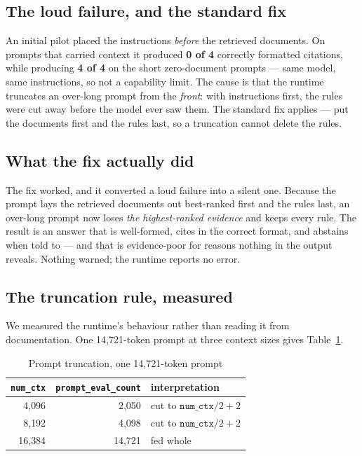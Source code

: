 \documentclass[conference]{IEEEtran}
\begin{document}
\subsection{The loud failure, and the standard fix}

An initial pilot placed the instructions \emph{before} the retrieved documents.
On prompts that carried context it produced \textbf{0 of 4} correctly formatted
citations, while producing \textbf{4 of 4} on the short zero-document prompts ---
same model, same instructions, so not a capability limit. The cause is that the
runtime truncates an over-long prompt from the \emph{front}: with instructions
first, the rules were cut away before the model ever saw them. The standard fix
applies --- put the documents first and the rules last, so a truncation cannot
delete the rules.

\subsection{What the fix actually did}

The fix worked, and it converted a loud failure into a silent one. Because the
prompt lays the retrieved documents out best-ranked first and the rules last, an
over-long prompt now loses \emph{the highest-ranked evidence} and keeps every
rule. The result is an answer that is well-formed, cites in the correct format,
and abstains when told to --- and that is evidence-poor for reasons nothing in the
output reveals. Nothing warned; the runtime reports no error.

\subsection{The truncation rule, measured}

We measured the runtime's behaviour rather than reading it from documentation.
One 14{,}721-token prompt at three context sizes gives Table~\ref{tab:trunc}.

\begin{table}[t]
\caption{Prompt truncation, one 14{,}721-token prompt}
\label{tab:trunc}
\centering
\begin{tabular}{rrl}
\toprule
\texttt{num\_ctx} & \texttt{prompt\_eval\_count} & interpretation \\
\midrule
4{,}096  & 2{,}050  & cut to $\texttt{num\_ctx}/2 + 2$ \\
8{,}192  & 4{,}098  & cut to $\texttt{num\_ctx}/2 + 2$ \\
16{,}384 & 14{,}721 & fed whole \\
\bottomrule
\end{tabular}
\end{table}
\end{document}
